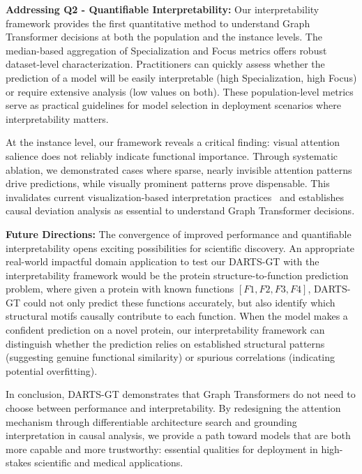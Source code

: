 \documentclass[lettersize,journal]{IEEEtran}
\begin{document}
\textbf{Addressing Q2 - Quantifiable Interpretability:} Our interpretability framework provides the first quantitative method to understand Graph Transformer decisions at both the population and the instance levels. The median-based aggregation of Specialization and Focus metrics offers robust dataset-level characterization. Practitioners can quickly assess whether the prediction of a model will be easily interpretable (high Specialization, high Focus) or require extensive analysis (low values on both). These population-level metrics serve as practical guidelines for model selection in deployment scenarios where interpretability matters.

At the instance level, our framework reveals a critical finding: visual attention salience does not reliably indicate functional importance. Through systematic ablation, we demonstrated cases where sparse, nearly invisible attention patterns drive predictions, while visually prominent patterns prove dispensable. This invalidates current visualization-based interpretation practices~\cite{el_towards_2025,hussain_global_2022} and establishes causal deviation analysis as essential to understand Graph Transformer decisions.

\textbf{Future Directions:} The convergence of improved performance and quantifiable interpretability opens exciting possibilities for scientific discovery. An appropriate real-world impactful domain application to test our DARTS-GT with the interpretability framework would be the protein structure-to-function prediction problem, where given a protein with known functions $[F1, F2, F3, F4]$, DARTS-GT could not only predict these functions accurately, but also identify which structural motifs causally contribute to each function. When the model makes a confident prediction on a novel protein, our interpretability framework can distinguish whether the prediction relies on established structural patterns (suggesting genuine functional similarity) or spurious correlations (indicating potential overfitting). 

In conclusion, DARTS-GT demonstrates that Graph Transformers do not need to choose between performance and interpretability. By redesigning the attention mechanism through differentiable architecture search and grounding interpretation in causal analysis, we provide a path toward models that are both more capable and more trustworthy: essential qualities for deployment in high-stakes scientific and medical applications.
\end{document}
